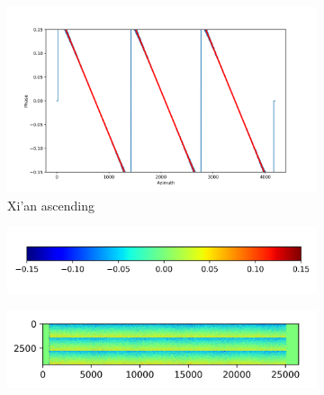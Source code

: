 \documentclass[preprint, authoryear]{elsarticle}
\begin{document}
\begin{figure}
\begin{subfigure}{0.5\textwidth}
\begin{minipage}{0.5\textwidth}
        \end{minipage}%
        \begin{minipage}{0.5\textwidth}
            \centering
            \includegraphics[width=\textwidth]{figure/The cross-interferogram/cross_interf_XiAn_asc_row&fitted_20230109.png}
        \end{minipage}
        \caption{Xi'an ascending}
        \label{fig_5e}
    \end{subfigure}%
    \begin{subfigure}{0.5\textwidth}
        \centering
        \includegraphics[width=\textwidth]{figure/The cross-interferogram/colorbar.png}
        \caption*{}
    \end{subfigure}%
    \hfill
    \begin{subfigure}{0.5\textwidth}
        \centering
        \begin{minipage}{0.5\textwidth}
            \centering
            \includegraphics[width=\textwidth]{figure/The cross-interferogram/cross_interf_Milan_asc.png}
        \end{minipage}%
        \begin{minipage}{0.5\textwidth}

\end{minipage}
\end{subfigure}
\end{figure}
\end{document}
